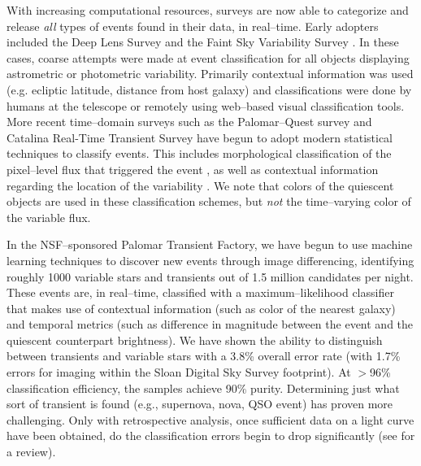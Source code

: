 
With increasing computational resources, surveys are now able to categorize and
release {\it all} types of events found in their data, in real--time. Early
adopters included the Deep Lens Survey \citep{2004ApJ...611..418B} and the Faint
Sky Variability Survey \citep{2003MNRAS.339..427G}.  In these cases, coarse
attempts were made at event classification for all objects displaying
astrometric or photometric variability. Primarily contextual information was
used (e.g. ecliptic latitude, distance from host galaxy) and classifications
were done by humans at the telescope or remotely using web--based visual
classification tools.  More recent time--domain surveys such as the
Palomar--Quest survey \citep{2008AN....329..263D} and Catalina Real-Time
Transient Survey \citep{2011arXiv1102.5004D} have begun to adopt modern
statistical techniques to classify events.  This includes morphological
classification of the pixel--level flux that triggered the event
\citep{2008AIPC.1082..252D}, as well as contextual information regarding the
location of the variability \citep{2010ASPC..434..115M}.  We note that colors of
the quiescent objects are used in these classification schemes, but {\it not}
the time--varying color of the variable flux.


In the NSF--sponsored Palomar Transient Factory, we have begun to use machine
learning techniques to discover new events through image differencing,
identifying roughly 1000 variable stars and transients out of 1.5 million
candidates per night. These events are, in real--time, classified with a
maximum--likelihood classifier that makes use of contextual information (such as
color of the nearest galaxy) and temporal metrics (such as difference in
magnitude between the event and the quiescent counterpart brightness).  We have
shown \citep{2011arXiv1106.5491B} the ability to distinguish between transients
and variable stars with a 3.8\% overall error rate (with 1.7\% errors for
imaging within the Sloan Digital Sky Survey footprint).  At $>$96\%
classification efficiency, the samples achieve 90\% purity.  Determining just
what sort of transient is found (e.g., supernova, nova, QSO event) has proven
more challenging.  Only with retrospective analysis, once sufficient data on a
light curve have been obtained, do the classification errors begin to drop
significantly \citep{2011ApJ...733...10R} (see \citealt{2011arXiv1104.3142B} for
a review).

